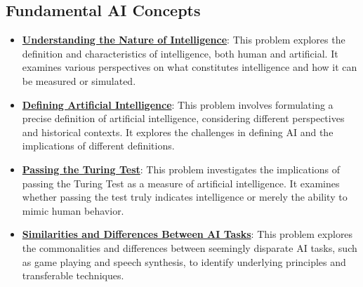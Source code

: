 \documentclass{article}%
\begin{document}
\subsection{Fundamental AI Concepts}%
\label{subsec:FundamentalAIConcepts}%
\begin{itemize}[leftmargin=*]%
\item \href{\url{https://purdue.brightspace.com/d2l/common/assets/pdfjs-d2l-dist/1.0.14-legacy/web/viewer.html?file=\%252Fcontent\%252Fenforced\%252F1095467-wl.202510.CS.24300.001\%252F02L2-Intro.pdf\%253Fou\%253D1095467\&lang=en-us\&container=d2l-fileviewer-rendered-pdf\&fullscreen=d2l-fileviewer-rendered-pdf-dialog\&height=667}#page=5}{\textbf{Understanding the Nature of Intelligence}}: This problem explores the definition and characteristics of intelligence, both human and artificial. It examines various perspectives on what constitutes intelligence and how it can be measured or simulated.%
\item \href{\url{https://purdue.brightspace.com/d2l/common/assets/pdfjs-d2l-dist/1.0.14-legacy/web/viewer.html?file=\%252Fcontent\%252Fenforced\%252F1095467-wl.202510.CS.24300.001\%252F02L2-Intro.pdf\%253Fou\%253D1095467\&lang=en-us\&container=d2l-fileviewer-rendered-pdf\&fullscreen=d2l-fileviewer-rendered-pdf-dialog\&height=667}#page=5}{\textbf{Defining Artificial Intelligence}}: This problem involves formulating a precise definition of artificial intelligence, considering different perspectives and historical contexts. It explores the challenges in defining AI and the implications of different definitions.%
\item \href{\url{https://purdue.brightspace.com/d2l/common/assets/pdfjs-d2l-dist/1.0.14-legacy/web/viewer.html?file=\%252Fcontent\%252Fenforced\%252F1095467-wl.202510.CS.24300.001\%252F02L2-Intro.pdf\%253Fou\%253D1095467\&lang=en-us\&container=d2l-fileviewer-rendered-pdf\&fullscreen=d2l-fileviewer-rendered-pdf-dialog\&height=667}#page=6}{\textbf{Passing the Turing Test}}: This problem investigates the implications of passing the Turing Test as a measure of artificial intelligence. It examines whether passing the test truly indicates intelligence or merely the ability to mimic human behavior.%
\item \href{\url{https://purdue.brightspace.com/d2l/common/assets/pdfjs-d2l-dist/1.0.14-legacy/web/viewer.html?file=\%252Fcontent\%252Fenforced\%252F1095467-wl.202510.CS.24300.001\%252F02L2-Intro.pdf\%253Fou\%253D1095467\&lang=en-us\&container=d2l-fileviewer-rendered-pdf\&fullscreen=d2l-fileviewer-rendered-pdf-dialog\&height=667}#page=31}{\textbf{Similarities and Differences Between AI Tasks}}: This problem explores the commonalities and differences between seemingly disparate AI tasks, such as game playing and speech synthesis, to identify underlying principles and transferable techniques.%
\end{itemize}
\end{document}
